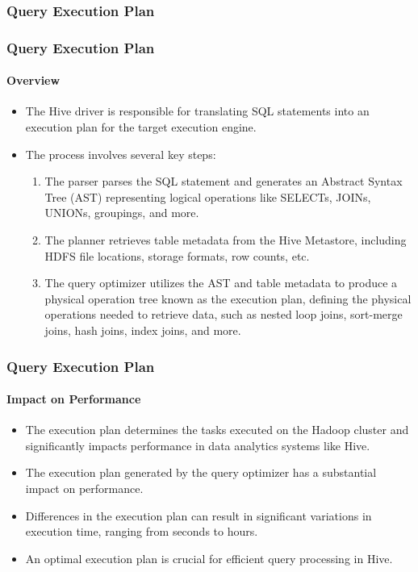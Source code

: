 \subsubsection{Query Execution Plan}
\begin{frame}
	\frametitle{Query Execution Plan}
	\framesubtitle{Overview}
	
	\begin{itemize}
	  \item The Hive driver is responsible for translating SQL statements into an execution plan for the target execution engine.
	  \item The process involves several key steps:
		\begin{enumerate}
		  \item The parser parses the SQL statement and generates an Abstract Syntax Tree (AST) representing logical operations like SELECTs, JOINs, UNIONs, groupings, and more.
		  \item The planner retrieves table metadata from the Hive Metastore, including HDFS file locations, storage formats, row counts, etc.
		  \item The query optimizer utilizes the AST and table metadata to produce a physical operation tree known as the execution plan, defining the physical operations needed to retrieve data, such as nested loop joins, sort-merge joins, hash joins, index joins, and more.
		\end{enumerate}

	\end{itemize}
	
	\end{frame}
	
	\begin{frame}
	\frametitle{Query Execution Plan}
	\framesubtitle{Impact on Performance}
	
	\begin{itemize}
	\item The execution plan determines the tasks executed on the Hadoop cluster and significantly impacts performance in data analytics systems like Hive.
	  \item The execution plan generated by the query optimizer has a substantial impact on performance.
	  \item Differences in the execution plan can result in significant variations in execution time, ranging from seconds to hours.
	  \item An optimal execution plan is crucial for efficient query processing in Hive.
	\end{itemize}
	
	\end{frame}
	
